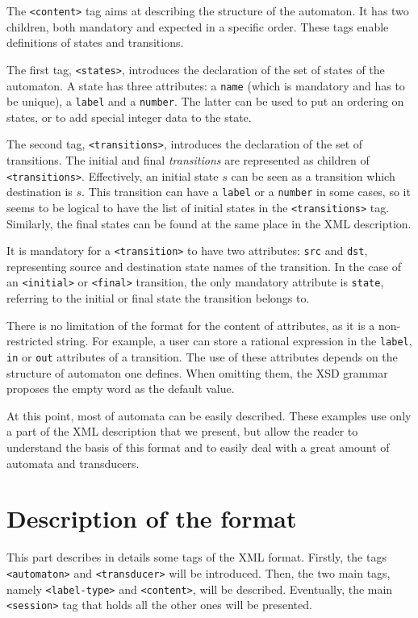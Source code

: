\documentclass[a4paper]{article}
\newcommand{\xtag}[1]{\texttt{<#1>}}
\newcommand{\xattr}[1]{\texttt{#1}}
\def\typetag{\xtag{label-type}}
\def\contenttag{\xtag{content}}
\def\statestag{\xtag{states}}
\def\dstname{\xattr{dst}}
\def\srcname{\xattr{src}}
\def\transitionstag{\xtag{transitions}}
\def\transitiontag{\xtag{transition}}
\def\finaltag{\xtag{final}}
\def\initialtag{\xtag{initial}}
\def\sessiontag{\xtag{session}}
\def\automatontag{\xtag{automaton}}
\def\transducertag{\xtag{transducer}}
\def\nameattr{\xattr{name}}
\def\labelattr{\xattr{label}}
\def\inattr{\xattr{in}}
\def\outattr{\xattr{out}}
\def\numberattr{\xattr{number}}
\def\stateattr{\xattr{state}}
\begin{document}
The \contenttag{} tag aims at describing the structure of the
automaton. It has two children, both mandatory and expected
in a specific order. These tags enable definitions of states
and transitions.

The first tag, \statestag{}, introduces the declaration of
the set of states of the automaton. A state has three attributes: a
\nameattr{} (which is mandatory and has to be unique), a \labelattr{}
and a \numberattr{}. The latter can be used to put an ordering on states,
or to add special integer data to the state.

The second tag, \transitionstag{}, introduces the declaration
of the set of transitions. The initial and final
\textit{transitions} are represented as children of
\transitionstag{}. Effectively, an initial state $s$ can be seen as a transition
which destination is $s$. This transition can have a \labelattr{} or a
\numberattr{} in some cases, so it seems to be logical to have the list of
initial states in the \transitionstag{} tag.  Similarly, the final
states can be found at the same place in the XML description.

It is mandatory for a \transitiontag{} to have two attributes:
\srcname{} and \dstname{}, representing source and destination state
names of the
transition. In the case of an \initialtag{} or \finaltag{} transition,
the only mandatory attribute is \stateattr{}, referring to the initial
or final state the transition belongs to.

There is no limitation of the format for the content of attributes, as
it is a non-restricted string. For example, a user can store a
rational expression in the \labelattr{}, \inattr{} or \outattr{}
attributes of a transition. The use of these attributes depends on the
structure of automaton one defines. When omitting them, the XSD
grammar proposes the empty word as the default value.

At this point, most of automata can be easily described. These
examples use only a part of the XML description that we present, but
allow the reader to understand the basis of this format and to easily
deal with a great amount of automata and transducers.

\section{Description of the format}

This part describes in details some tags of the XML format.  Firstly,
the tags \automatontag{} and \transducertag{} will be introduced.
Then, the two main tags, namely \typetag{} and \contenttag{}, will be
described.  Eventually, the main \sessiontag{} tag that holds all the
other ones will be presented.
\end{document}

